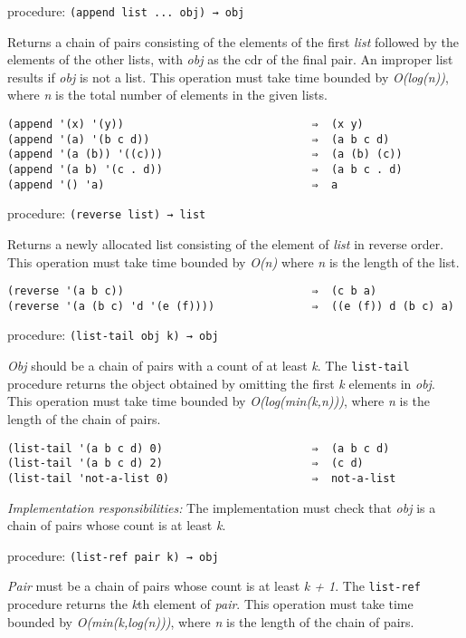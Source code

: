 procedure: \texttt{(append\ list\ ...\ obj)\ →\ obj}

Returns a chain of pairs consisting of the elements of the first
\emph{list} followed by the elements of the other lists, with \emph{obj}
as the cdr of the final pair. An improper list results if \emph{obj} is
not a list. This operation must take time bounded by \emph{O(log(n))},
where \emph{n} is the total number of elements in the given lists.

\begin{verbatim}
(append '(x) '(y))                             ⇒  (x y)
(append '(a) '(b c d))                         ⇒  (a b c d)
(append '(a (b)) '((c)))                       ⇒  (a (b) (c))
(append '(a b) '(c . d))                       ⇒  (a b c . d)
(append '() 'a)                                ⇒  a
\end{verbatim}

procedure: \texttt{(reverse\ list)\ →\ list}

Returns a newly allocated list consisting of the element of \emph{list}
in reverse order. This operation must take time bounded by \emph{O(n)}
where \emph{n} is the length of the list.

\begin{verbatim}
(reverse '(a b c))                             ⇒  (c b a)
(reverse '(a (b c) 'd '(e (f))))               ⇒  ((e (f)) d (b c) a)
\end{verbatim}

procedure: \texttt{(list-tail\ obj\ k)\ →\ obj}

\emph{Obj} should be a chain of pairs with a count of at least \emph{k}.
The \texttt{list-tail} procedure returns the object obtained by omitting
the first \emph{k} elements in \emph{obj}. This operation must take time
bounded by \emph{O(log(min(k,n)))}, where \emph{n} is the length of the
chain of pairs.

\begin{verbatim}
(list-tail '(a b c d) 0)                       ⇒  (a b c d)
(list-tail '(a b c d) 2)                       ⇒  (c d)
(list-tail 'not-a-list 0)                      ⇒  not-a-list
\end{verbatim}

\emph{Implementation responsibilities:} The implementation must check
that \emph{obj} is a chain of pairs whose count is at least \emph{k}.

procedure: \texttt{(list-ref\ pair\ k)\ →\ obj}

\emph{Pair} must be a chain of pairs whose count is at least \emph{k +
1}. The \texttt{list-ref} procedure returns the \emph{k}th element of
\emph{pair}. This operation must take time bounded by
\emph{O(min(k,log(n)))}, where \emph{n} is the length of the chain of
pairs.

